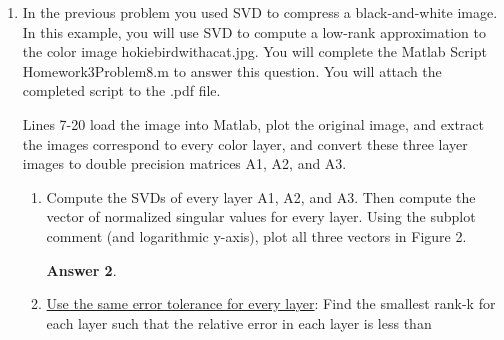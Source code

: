 \documentclass{article}
\theoremstyle{definition}
\newtheorem*{answer}{Answer}
\begin{document}
\begin{enumerate}[leftmargin=\labelsep]
\begin{enumerate}
\begin{answer}
\begin{figure}
				            \begin{subfigure}{0.225\textwidth}
					            \centering
					            \texttt{[image: out/Rank\_10\_Approximation.png]}
					            \caption{\(k=10\)}\label{fig:Thumb10}
				            \end{subfigure}\qquad
				            \begin{subfigure}{0.225\textwidth}
					            \centering
					            \texttt{[image: out/Rank\_50\_Approximation.png]}
					            \caption{\(k=50\)}\label{fig:Thumb50}
				            \end{subfigure}
				            \caption{Original fingerprint image compared to its optimal rank-\(k \) approximations.}\label{fig:Thums}
			            \end{figure}
						\begin{mdframed}[backgroundcolor=lightgray]
						\end{mdframed}
		            \end{answer}
	      \end{enumerate}

	\item In the previous problem you used SVD to compress a black-and-white image. In this example, you will use SVD to compute a low-rank approximation to the color image hokiebirdwithacat.jpg. You will complete the Matlab Script Homework3Problem8.m to answer this question. You will attach the completed script to the .pdf file.

	      Lines 7-20 load the image into Matlab, plot the original image, and extract the images correspond to every color layer, and convert these three layer images to double precision matrices A1, A2, and A3.
	      \begin{enumerate}
		      \item Compute the SVDs of every layer A1, A2, and A3. Then compute the vector of normalized singular values for every layer. Using the subplot comment (and logarithmic y-axis), plot all three vectors in Figure 2.
		            \begin{answer}

		            \end{answer}

		      \item \underline{Use the same error tolerance for every layer}: Find the smallest rank-k for each layer such that the relative error in each layer is less than


\end{enumerate}
\end{enumerate}
\end{document}
